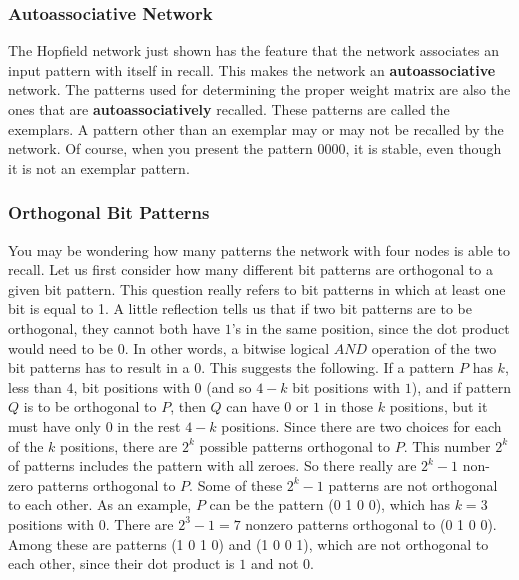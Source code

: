 \documentclass[12pt, right open]{memoir}
\begin{document}
\subsubsection{Autoassociative Network}
The Hopfield network just shown has the feature that the network associates an
input pattern with itself in recall. This makes the network an \textbf{autoassociative}
network. The patterns used for determining the proper weight matrix are also
the ones that are \textbf{autoassociatively} recalled. These patterns are called the
exemplars. A pattern other than an exemplar may or may not be recalled by the
network. Of course, when you present the pattern $0 0 0 0$, it is stable, even
though it is not an exemplar pattern.
\subsubsection{Orthogonal Bit Patterns}
You may be wondering how many patterns the network with four nodes is able
to recall. Let us first consider how many different bit patterns are orthogonal to
a given bit pattern. This question really refers to bit patterns in which at least
one bit is equal to 1. A little reflection tells us that if two bit patterns are to be
orthogonal, they cannot both have $1$'s in the same position, since the dot
product would need to be $0$. In other words, a bitwise logical $AND$ operation
of the two bit patterns has to result in a $0$. This suggests the following. If a
pattern $P$ has $k$, less than $4$, bit positions with $0$ (and so $4-k$ bit positions with
$1$), and if pattern $Q$ is to be orthogonal to $P$, then $Q$ can have $0$ or $1$ in those $k$ positions, but it must have only $0$ in the rest $4-k$ positions. Since there are two
choices for each of the $k$ positions, there are $2^k$ possible patterns orthogonal to
$P$. This number $2^k$ of patterns includes the pattern with all zeroes. So there
really are $2^k-1$ non-zero patterns orthogonal to $P$. Some of these $2^k-1$ patterns are not orthogonal to each other. As an example, $P$ can be the pattern (0 1 0 0),
which has $k=3$ positions with $0$. There are $2^3-1=7$ nonzero patterns
orthogonal to (0 1 0 0). Among these are patterns (1 0 1 0) and (1 0 0 1), which are
not orthogonal to each other, since their dot product is $1$ and not $0$.
\end{document}
